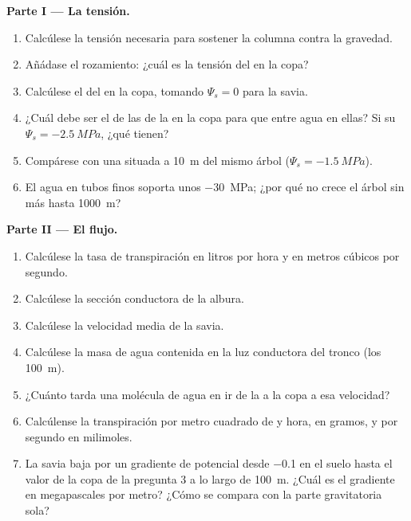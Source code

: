 \begin{problem}
\medskip
\noindent\textbf{Parte I --- La tensión.}
\begin{enumerate}
  \item Calcúlese la tensión necesaria para sostener la columna contra la
        gravedad.
  \item Añádase el rozamiento: ¿cuál es la tensión del  en la copa?
  \item Calcúlese el  del  en la copa, tomando
        $\Psi_s = 0$ para la savia.
  \item ¿Cuál debe ser el  de las  de la  en la
        copa para que entre agua en ellas? Si su $\Psi_s = \qty{-2.5}{MPa}$,
        ¿qué  tienen?
  \item Compárese con una  situada a \qty{10}{m} del mismo árbol
        ($\Psi_s =
        \qty{-1.5}{MPa}$).
  \item El agua en tubos finos soporta unos \qty{-30}{MPa}; ¿por qué no
        crece el árbol sin más hasta \qty{1000}{m}?
\end{enumerate}

\medskip
\noindent\textbf{Parte II --- El flujo.}
\begin{enumerate}[resume]
  \item Calcúlese la tasa de transpiración en litros por hora y en metros
        cúbicos por segundo.
  \item Calcúlese la sección conductora de la albura.
  \item Calcúlese la velocidad media de la savia.
  \item Calcúlese la masa de agua contenida en la luz conductora del tronco
        (los \qty{100}{m}).
  \item ¿Cuánto tarda una molécula de agua en ir de la  a la copa a esa
        velocidad?
  \item Calcúlense la transpiración por metro cuadrado de  y hora, en
        gramos, y por segundo en milimoles.
  \item La savia baja por un gradiente de potencial desde \qty{-0.1}{} en el
        suelo hasta el valor de la copa de la pregunta 3 a lo largo de
        \qty{100}{m}. ¿Cuál es el gradiente en megapascales por metro? ¿Cómo
        se compara con la parte gravitatoria sola?
\end{enumerate}


\end{problem}
